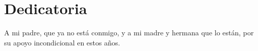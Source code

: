 
\chapter*{Dedicatoria}

A mi padre, que ya no está conmigo, y a mi madre y hermana que lo están, por su apoyo incondicional en estos años.


